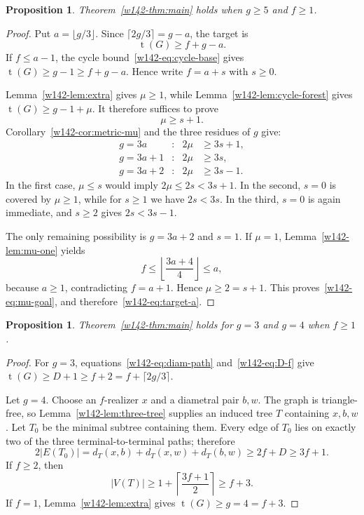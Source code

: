 \documentclass[11pt]{article}
\numberwithin{equation}{section}
\newtheorem{proposition}[theorem]{Proposition}
\theoremstyle{remark}
\newcommand{\tr}{\operatorname{t}}
\begin{document}
\begin{proposition}\label{w142-prop:large-girth}
Theorem~\ref{w142-thm:main} holds when $g\ge5$ and $f\ge1$.
\end{proposition}

\begin{proof}
Put $a=\lfloor g/3\rfloor$.  Since
$\lceil2g/3\rceil=g-a$, the target is
\begin{equation}\label{w142-eq:target-a}
  \tr(G)\ge f+g-a.
\end{equation}
If $f\le a-1$, the cycle bound~\eqref{w142-eq:cycle-base} gives
$\tr(G)\ge g-1\ge f+g-a$.  Hence write $f=a+s$ with $s\ge0$.

Lemma~\ref{w142-lem:extra} gives $\mu\ge1$, while
Lemma~\ref{w142-lem:cycle-forest} gives $\tr(G)\ge g-1+\mu$.  It therefore
suffices to prove
\begin{equation}\label{w142-eq:mu-goal}
  \mu\ge s+1.
\end{equation}
Corollary~\ref{w142-cor:metric-mu} and the three residues of $g$ give:
\begin{align*}
 g=3a   &: &2\mu&\ge3s+1,\\
 g=3a+1 &: &2\mu&\ge3s,\\
 g=3a+2 &: &2\mu&\ge3s-1.
\end{align*}
In the first case, $\mu\le s$ would imply $2\mu\le2s<3s+1$.
In the second, $s=0$ is covered by $\mu\ge1$, while for $s\ge1$ we have
$2s<3s$.  In the third, $s=0$ is again immediate, and $s\ge2$ gives
$2s<3s-1$.

The only remaining possibility is $g=3a+2$ and $s=1$.  If $\mu=1$,
Lemma~\ref{w142-lem:mu-one} yields
\[
 f\le\left\lfloor\frac{3a+4}{4}\right\rfloor\le a,
\]
because $a\ge1$, contradicting $f=a+1$.  Hence $\mu\ge2=s+1$.
This proves~\eqref{w142-eq:mu-goal}, and therefore~\eqref{w142-eq:target-a}.
\end{proof}

\begin{proposition}\label{w142-prop:small-girth}
Theorem~\ref{w142-thm:main} holds for $g=3$ and $g=4$ when $f\ge1$.
\end{proposition}

\begin{proof}
For $g=3$, equations~\eqref{w142-eq:diam-path} and~\eqref{w142-eq:D-f} give
$\tr(G)\ge D+1\ge f+2=f+\lceil2g/3\rceil$.

Let $g=4$.  Choose an $f$-realizer $x$ and a diametral pair $b,w$.  The graph
is triangle-free, so Lemma~\ref{w142-lem:three-tree} supplies an induced tree $T$
containing $x,b,w$.  Let $T_0$ be the minimal subtree containing them.  Every
edge of $T_0$ lies on exactly two of the three terminal-to-terminal paths;
therefore
\[
  2|E(T_0)|=d_T(x,b)+d_T(x,w)+d_T(b,w)
   \ge 2f+D\ge3f+1.
\]
If $f\ge2$, then
\[
 |V(T)|\ge1+\left\lceil\frac{3f+1}{2}\right\rceil\ge f+3.
\]
If $f=1$, Lemma~\ref{w142-lem:extra} gives $\tr(G)\ge g=4=f+3$.
\end{proof}
\end{document}
